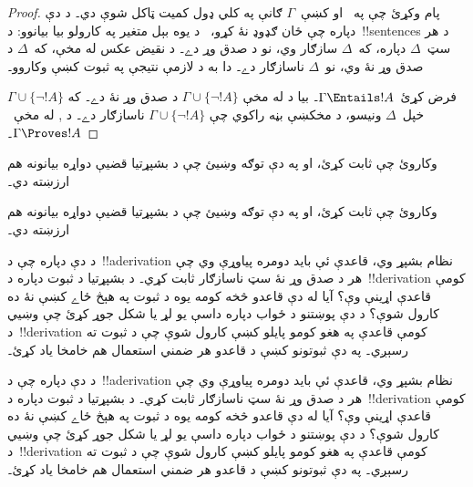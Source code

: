 \documentclass[../../../include/open-logic-section]{subfiles}
\begin{document}
\begin{proof}
پام وکړئ چې په~ او
 کښې~$\Gamma$ ګانې په کلي ډول کميت ټاکل شوې
دي۔ د دې دپاره چې ځان ګډوډ نۀ کړو،~ د يوه
بېل متغير په کارولو بيا بيانوو: د~!!{sentence}s د هر سټ~$\Delta$
دپاره، که~$\Delta$ سازګار وي، نو د صدق وړ دے۔ د نقيض عکس له مخې،
که~$\Delta$ د صدق وړ نۀ وي، نو~$\Delta$ ناسازګار دے۔ دا به د لازمې
نتيجې په ثبوت کښې وکاروو۔

فرض کړئ~$\Gamma \Entails !A$۔ بيا د
 له مخې
$\Gamma \cup \{\lnot !A\}$ د صدق وړ نۀ دے۔ که
$\Gamma \cup \{\lnot !A\}$ خپل~$\Delta$ ونيسو، د
 مخکښې بڼه راکوي چې
$\Gamma \cup \{\lnot !A\}$ ناسازګار دے۔ د
,
له مخې~$\Gamma \Proves !A$۔
\end{proof}

\begin{prob}
 وکاروئ چې
 ثابت کړئ، او په دې توګه
وښيئ چې د بشپړتيا قضيې دواړه بيانونه هم ارزښته دي۔
\end{prob}
\tagendprob

\begin{prob}
 وکاروئ چې
 ثابت کړئ، او په دې توګه
وښيئ چې د بشپړتيا قضيې دواړه بيانونه هم ارزښته دي۔
\end{prob}
\tagendprob

\begin{prob}
د دې دپاره چې د~!!a{derivation} نظام بشپړ وي، قاعدې ئې بايد دومره
پياوړې وي چې هر د صدق وړ نۀ سټ ناسازګار ثابت کړي۔ د بشپړتيا د ثبوت
دپاره د~!!{derivation} کومې قاعدې اړينې وې؟ آيا له دې قاعدو څخه
کومه يوه د ثبوت په هېڅ ځاے کښې نۀ ده کارول شوې؟ د دې پوښتنو د ځواب
دپاره داسې يو لړ يا شکل جوړ کړئ چې وښيي د~!!{derivation} کومې
قاعدې په هغو کومو پايلو کښې کارول شوې چې د
 ثبوت ته رسېږي۔ په دې ثبوتونو
کښې د قاعدو هر ضمني استعمال هم خامخا ياد کړئ۔
\end{prob}
\tagendprob

\begin{prob}
د دې دپاره چې د~!!a{derivation} نظام بشپړ وي، قاعدې ئې بايد دومره
پياوړې وي چې هر د صدق وړ نۀ سټ ناسازګار ثابت کړي۔ د بشپړتيا د ثبوت
دپاره د~!!{derivation} کومې قاعدې اړينې وې؟ آيا له دې قاعدو څخه
کومه يوه د ثبوت په هېڅ ځاے کښې نۀ ده کارول شوې؟ د دې پوښتنو د ځواب
دپاره داسې يو لړ يا شکل جوړ کړئ چې وښيي د~!!{derivation} کومې
قاعدې په هغو کومو پايلو کښې کارول شوې چې د
 ثبوت ته رسېږي۔ په دې ثبوتونو
کښې د قاعدو هر ضمني استعمال هم خامخا ياد کړئ۔
\end{prob}
\tagendprob
\end{document}
